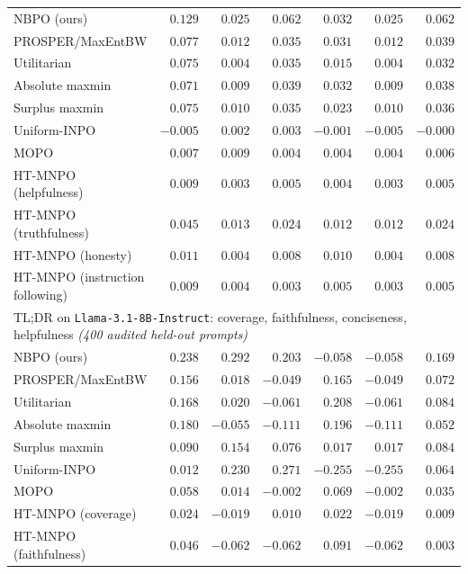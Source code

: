 \documentclass{article}
\theoremstyle{remark}
\theoremstyle{plain}
\newcommand{\NBPO}{\textsc{NBPO}}
\begin{document}
\begin{table}[t]
\begin{tabular}{lrrrrrr}
\NBPO{} (ours) & $\mathbf{0.129}$ & $\mathbf{0.025}$ & $\mathbf{0.062}$ & $\mathbf{0.032}$ & $\mathbf{0.025}$ & $\mathbf{0.062}$\\
PROSPER/MaxEntBW & $0.077$ & $0.012$ & $0.035$ & $0.031$ & $0.012$ & $0.039$\\
Utilitarian & $0.075$ & $0.004$ & $0.035$ & $0.015$ & $0.004$ & $0.032$\\
Absolute maxmin & $0.071$ & $0.009$ & $0.039$ & $0.032$ & $0.009$ & $0.038$\\
Surplus maxmin & $0.075$ & $0.010$ & $0.035$ & $0.023$ & $0.010$ & $0.036$\\
Uniform-INPO & $-0.005$ & $0.002$ & $0.003$ & $-0.001$ & $-0.005$ & $-0.000$\\
MOPO & $0.007$ & $0.009$ & $0.004$ & $0.004$ & $0.004$ & $0.006$\\
HT-MNPO (helpfulness) & $0.009$ & $0.003$ & $0.005$ & $0.004$ & $0.003$ & $0.005$\\
HT-MNPO (truthfulness) & $0.045$ & $0.013$ & $0.024$ & $0.012$ & $0.012$ & $0.024$\\
HT-MNPO (honesty) & $0.011$ & $0.004$ & $0.008$ & $0.010$ & $0.004$ & $0.008$\\
HT-MNPO (instruction following) & $0.009$ & $0.004$ & $0.003$ & $0.005$ & $0.003$ & $0.005$\\
\midrule
\multicolumn{7}{l}{\textsc{TL;DR} on \texttt{Llama-3.1-8B-Instruct}: coverage, faithfulness, conciseness, helpfulness \emph{(400 audited held-out prompts)}}\\
\NBPO{} (ours) & $\mathbf{0.238}$ & $\mathbf{0.292}$ & $0.203$ & $-0.058$ & $-0.058$ & $\mathbf{0.169}$\\
PROSPER/MaxEntBW & $0.156$ & $0.018$ & $-0.049$ & $0.165$ & $-0.049$ & $0.072$\\
Utilitarian & $0.168$ & $0.020$ & $-0.061$ & $\mathbf{0.208}$ & $-0.061$ & $0.084$\\
Absolute maxmin & $0.180$ & $-0.055$ & $-0.111$ & $0.196$ & $-0.111$ & $0.052$\\
Surplus maxmin & $0.090$ & $0.154$ & $0.076$ & $\mathbf{0.017}$ & $\mathbf{0.017}$ & $0.084$\\
Uniform-INPO & $0.012$ & $0.230$ & $\mathbf{0.271}$ & $-0.255$ & $-0.255$ & $0.064$\\
MOPO & $0.058$ & $0.014$ & $-0.002$ & $0.069$ & $-0.002$ & $0.035$\\
HT-MNPO (coverage) & $0.024$ & $-0.019$ & $0.010$ & $0.022$ & $-0.019$ & $0.009$\\
HT-MNPO (faithfulness) & $0.046$ & $-0.062$ & $-0.062$ & $0.091$ & $-0.062$ & $0.003$\\

\end{tabular}
\end{table}
\end{document}

